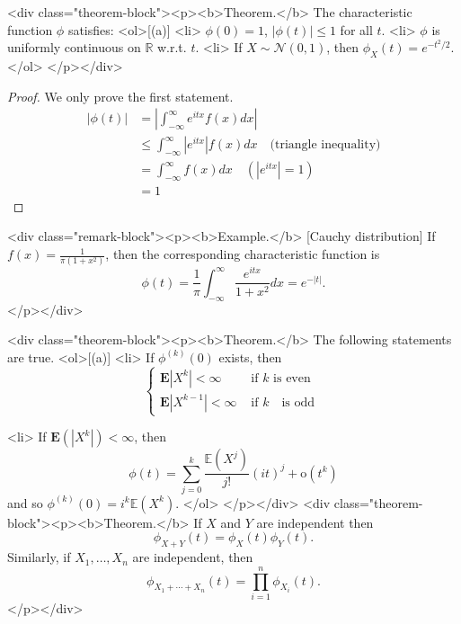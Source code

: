 <div class="theorem-block"><p><b>Theorem.</b> 
The characteristic function $\phi$ satisfies:
<ol>[(a)]
    <li> $\phi(0) = 1$, $\left\vert \phi(t) \right\vert \leq 1$ for all $t$.
    <li> $\phi$ is uniformly continuous on $\mathbb{R}$ w.r.t. $t$.
    <li> If $X \sim \mathcal{N}(0,1)$, then $\phi_{X}(t) = e^{-t^2/2}$.
</ol>
</p></div>

\begin{proof}
We only prove the first statement.
$$\begin{equation}
    \begin{split}
        \left\vert \phi(t) \right\vert &= \left\vert \int_{-\infty}^\infty e^{itx} f(x)dx  \right\vert \\
        &\leq \int_{-\infty}^\infty \left\vert e^{itx} \right\vert f(x) dx \quad \text{(triangle inequality)} \\
        &= \int_{-\infty}^\infty f(x) dx \quad (\left\vert e^{itx} \right\vert=1) \\
        &= 1
    \end{split}
\end{equation}$$
\end{proof}

<div class="remark-block"><p><b>Example.</b> [Cauchy distribution]
If $f(x) = 
\frac{1}{\pi(1+x^2)}$, then the corresponding characteristic function is 
$$\begin{equation}
    \phi(t)=\frac{1}{\pi} \int_{-\infty}^{\infty} \frac{e^{i t x}}{1+x^{2}} d x = e^{-\left\vert t \right\vert}.
\end{equation}$$
</p></div>

<div class="theorem-block"><p><b>Theorem.</b> 
The following statements are true.
<ol>[(a)]
    <li> If $\phi^{(k)}(0)$ exists, then 
    $$\begin{equation}
        \left\{\begin{array}{ll}{\mathbf{E}\left|X^{k}\right|<\infty} & {\text { if $k$}  \text { is even }} \\ {\mathbf{E}\left|X^{k-1}\right|<\infty} & {\text { if $k$ } \text { is odd }}\end{array}\right.
    \end{equation}$$
    
    <li> If $\mathbf{E}(\left\vert X^k \right\vert) < \infty$, then 
    $$\begin{equation}
        \phi(t)=\sum_{j=0}^{k} \frac{\mathbb{E}\left(X^{j}\right)}{j !}(i t)^{j}+\mathrm{o}\left(t^{k}\right)
    \end{equation}$$
    and so $\phi^{(k)}(0)=i^{k} \mathbb{E}\left(X^{k}\right)$.
</ol>
</p></div>
<div class="theorem-block"><p><b>Theorem.</b> 
If $X$ and $Y$ are independent then 
$$\begin{equation}
    \phi_{X+Y}(t)=\phi_{X}(t) \phi_{Y}(t).
\end{equation}$$
Similarly, if $X_1, \dots, X_n$ are independent, then 
$$\begin{equation}
    \phi_{X_1 + \cdots + X_n}(t)= \prod_{i=1}^n \phi_{X_i}(t).
\end{equation}$$
</p></div>


